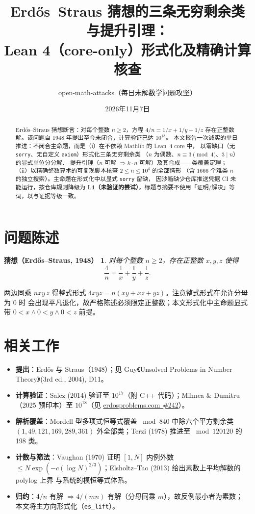 \documentclass[11pt]{article}
\title{Erd\H{o}s--Straus 猜想的三条无穷剩余类与提升引理：\\
Lean 4（core-only）形式化及精确计算核查}
\author{open-math-attacks（每日未解数学问题攻坚）}
\date{2026年11月7日}
\newtheorem*{conjecture*}{猜想（Erd\H{o}s--Straus, 1948）}
\begin{document}
\maketitle

\begin{abstract}
Erd\H{o}s--Straus 猜想断言：对每个整数 $n \ge 2$，方程 $4/n = 1/x + 1/y + 1/z$
存在正整数解。该问题自 1948 年提出至今未闭合，计算验证已达 $10^{18}$。
本文报告一次诚实的单日推进：不闭合主命题，而是（i）在不依赖 Mathlib 的 Lean~4 core 中，
以零缺口（无 \texttt{sorry}、无自定义 \texttt{axiom}）形式化三条无穷剩余类
（$n$ 为偶数、$n \equiv 3 \pmod 4$、$3 \mid n$）的显式单位分分解、
提升引理（$n$ 可解 $\Rightarrow k\cdot n$ 可解）及其合成——类覆盖定理；
（ii）以精确整数算术的可复现脚本核查 $2 \le n \le 10^4$ 的全部情形
（含 $1666$ 个难类 $n$ 的独立搜索）。主命题在形式化中以显式 \texttt{sorry} 留缺，
因沙箱缺少仓库推送凭据 CI 未能运行，按仓库规则降级为
\textbf{L1（未验证的尝试）}。标题与摘要不使用「证明/解决」等词，以与证据等级一致。
\end{abstract}

\section{问题陈述}

\begin{conjecture*}
对每个整数 $n \ge 2$，存在正整数 $x, y, z$ 使得
\[
  \frac{4}{n} = \frac{1}{x} + \frac{1}{y} + \frac{1}{z}.
  \tag{ES}
\]
\end{conjecture*}

两边同乘 $nxy\,z$ 得整式形式 $4xyz = n(xy + xz + yz)$。注意整式形式在允许分母为 $0$ 时
会出现平凡退化，故严格陈述必须限定正整数；本文形式化中主命题显式带
$0 < x \wedge 0 < y \wedge 0 < z$ 前提。

\section{相关工作}

\begin{itemize}
  \item \textbf{提出}：Erd\H{o}s 与 Straus（1948）；见 Guy《Unsolved Problems in Number Theory》(3rd ed., 2004), D11。
  \item \textbf{计算验证}：Salez (2014) 验证至 $10^{17}$（附 C++ 代码）；Mihnea \& Dumitru（2025 预印本）至 $10^{18}$（见 \href{https://www.erdosproblems.com/242}{erdosproblems.com \#242}）。
  \item \textbf{解析覆盖}：Mordell 型多项式恒等式覆盖 $\bmod 840$ 中除六个平方剩余类
        $(1, 49, 121, 169, 289, 361)$ 外全部类；Terzi (1978) 推进至 $\bmod 120120$ 的 198 类。
  \item \textbf{计数与筛法}：Vaughan (1970) 证明 $[1,N]$ 内例外数
        $\le N\exp(-c(\log N)^{2/3})$；Elsholtz--Tao (2013) 给出素数上平均解数的 polylog 上界
        与系统的模恒等式体系。
  \item \textbf{归约}：$4/n$ 有解 $\Rightarrow 4/(mn)$ 有解（分母同乘 $m$），故反例最小者为素数；
        本文将主方向形式化（\texttt{es\_lift}）。
\end{itemize}
\end{document}
